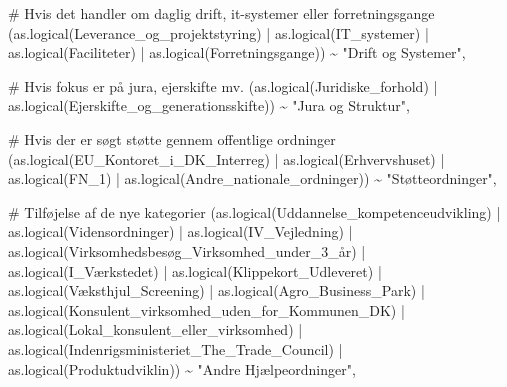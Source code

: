 \documentclass[
  11pt,
  letterpaper,
  DIV=11,
  numbers=noendperiod]{scrartcl}
\newenvironment{Shaded}{\begin{snugshade}}{\end{snugshade}}
\newcommand{\CommentTok}[1]{\textcolor[rgb]{0.37,0.37,0.37}{#1}}
\newcommand{\FunctionTok}[1]{\textcolor[rgb]{0.28,0.35,0.67}{#1}}
\newcommand{\NormalTok}[1]{\textcolor[rgb]{0.00,0.23,0.31}{#1}}
\newcommand{\SpecialCharTok}[1]{\textcolor[rgb]{0.37,0.37,0.37}{#1}}
\newcommand{\StringTok}[1]{\textcolor[rgb]{0.13,0.47,0.30}{#1}}
\begin{document}
\begin{Shaded}
\begin{Highlighting}[]
\CommentTok{\# Hvis det handler om daglig drift, it{-}systemer eller forretningsgange}
\NormalTok{      (}\FunctionTok{as.logical}\NormalTok{(Leverance\_og\_projektstyring) }\SpecialCharTok{|} \FunctionTok{as.logical}\NormalTok{(IT\_systemer) }\SpecialCharTok{|} 
         \FunctionTok{as.logical}\NormalTok{(Faciliteter) }\SpecialCharTok{|} 
         \FunctionTok{as.logical}\NormalTok{(Forretningsgange)) }\SpecialCharTok{\textasciitilde{}} \StringTok{"Drift og Systemer"}\NormalTok{,}
      
\CommentTok{\# Hvis fokus er på jura, ejerskifte mv.}
\NormalTok{      (}\FunctionTok{as.logical}\NormalTok{(Juridiske\_forhold) }\SpecialCharTok{|} 
         \FunctionTok{as.logical}\NormalTok{(Ejerskifte\_og\_generationsskifte)) }\SpecialCharTok{\textasciitilde{}} \StringTok{"Jura og Struktur"}\NormalTok{,}
    
\CommentTok{\# Hvis der er søgt støtte gennem offentlige ordninger}
\NormalTok{      (}\FunctionTok{as.logical}\NormalTok{(EU\_Kontoret\_i\_DK\_Interreg) }\SpecialCharTok{|} \FunctionTok{as.logical}\NormalTok{(Erhvervshuset) }\SpecialCharTok{|} 
         \FunctionTok{as.logical}\NormalTok{(FN\_1) }\SpecialCharTok{|} 
         \FunctionTok{as.logical}\NormalTok{(Andre\_nationale\_ordninger)) }\SpecialCharTok{\textasciitilde{}} \StringTok{"Støtteordninger"}\NormalTok{,}
      
      \CommentTok{\# Tilføjelse af de nye kategorier}
\NormalTok{      (}\FunctionTok{as.logical}\NormalTok{(Uddannelse\_kompetenceudvikling) }\SpecialCharTok{|} 
         \FunctionTok{as.logical}\NormalTok{(Vidensordninger) }\SpecialCharTok{|} 
         \FunctionTok{as.logical}\NormalTok{(IV\_Vejledning) }\SpecialCharTok{|} 
         \FunctionTok{as.logical}\NormalTok{(Virksomhedsbesøg\_Virksomhed\_under\_3\_år) }\SpecialCharTok{|} 
         \FunctionTok{as.logical}\NormalTok{(I\_Værkstedet) }\SpecialCharTok{|} 
         \FunctionTok{as.logical}\NormalTok{(Klippekort\_Udleveret) }\SpecialCharTok{|} 
         \FunctionTok{as.logical}\NormalTok{(Væksthjul\_Screening) }\SpecialCharTok{|} 
         \FunctionTok{as.logical}\NormalTok{(Agro\_Business\_Park) }\SpecialCharTok{|} 
         \FunctionTok{as.logical}\NormalTok{(Konsulent\_virksomhed\_uden\_for\_Kommunen\_DK) }\SpecialCharTok{|} 
         \FunctionTok{as.logical}\NormalTok{(Lokal\_konsulent\_eller\_virksomhed) }\SpecialCharTok{|} 
         \FunctionTok{as.logical}\NormalTok{(Indenrigsministeriet\_The\_Trade\_Council) }\SpecialCharTok{|} 
         \FunctionTok{as.logical}\NormalTok{(Produktudviklin)) }\SpecialCharTok{\textasciitilde{}} \StringTok{"Andre Hjælpeordninger"}\NormalTok{,}
      

\end{Highlighting}
\end{Shaded}
\end{document}
